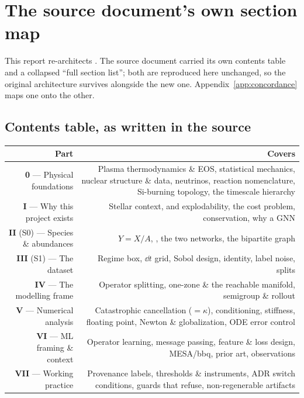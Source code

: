 \section{The source document's own section map}
\label{app:sectionmap}

This report re-architects . The source document carried its
own contents table and a collapsed ``full section list''; both are reproduced
here unchanged, so the original architecture survives alongside the new one.
Appendix~\ref{app:concordance} maps one onto the other.

\subsection{Contents table, as written in the source}

\begin{center}
\small
\begin{tabularx}{\textwidth}{@{}R{0.55} R{1.45}@{}}
\toprule
\textbf{Part} & \textbf{Covers} \\
\midrule
\textbf{0} --- Physical foundations &
  Plasma thermodynamics \& EOS, statistical mechanics, nuclear structure \&
  data, neutrinos, reaction nomenclature, Si-burning topology, the timescale
  hierarchy \\
\textbf{I} --- Why this project exists &
  Stellar context, \Ye{} and explodability, the cost problem, conservation, why
  a GNN \\
\textbf{II} (S0) --- Species \& abundances &
  $Y = X/A$, \Ye{}, the two networks, the bipartite graph \\
\textbf{III} (S1) --- The dataset &
  Regime box, $\dd t$ grid, Sobol design, identity, label noise, splits \\
\textbf{IV} --- The modelling frame &
  Operator splitting, one-zone \& the reachable manifold, semigroup \& rollout \\
\textbf{V} --- Numerical analysis &
  Catastrophic cancellation ($=\kappa$), conditioning, stiffness, floating
  point, Newton \& globalization, ODE error control \\
\textbf{VI} --- ML framing \& context &
  Operator learning, message passing, feature \& loss design, MESA/bbq, prior
  art, observations \\
\textbf{VII} --- Working practice &
  Provenance labels, thresholds \& instruments, ADR switch conditions, guards
  that refuse, non-regenerable artifacts \\
\bottomrule
\end{tabularx}
\end{center}

